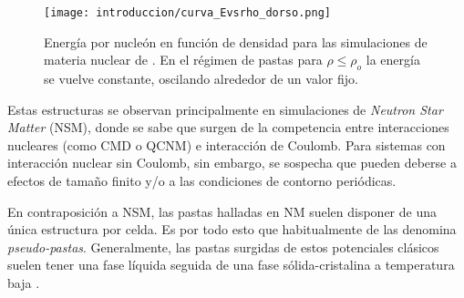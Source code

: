 \begin{figure}[H]
	\centering
	\texttt{[image: introduccion/curva\_Evsrho\_dorso.png]}
	\caption{Energía por nucleón en función de densidad para las simulaciones de materia nuclear de \cite{Dorso2018}.
	En el régimen de pastas para $\rho\leq\rho_o$ la energía se vuelve constante, oscilando alrededor de un valor fijo.}
	\label{fig:curva_Evsrho_dorso}
\end{figure}

Estas estructuras se observan principalmente en simulaciones de \textit{Neutron Star Matter} (NSM)\cite{Alcain}, donde se sabe que surgen de la competencia entre interacciones nucleares (como CMD o QCNM) e interacción de Coulomb. 
Para sistemas con interacción nuclear sin Coulomb, sin embargo, se sospecha que pueden deberse a efectos de tamaño finito y/o a las condiciones de contorno periódicas.

En contraposición a NSM, las pastas halladas en NM suelen disponer de una única estructura por celda.
Es por todo esto que habitualmente de las denomina \textit{pseudo-pastas}.
Generalmente, las pastas surgidas de estos potenciales clásicos suelen tener una fase líquida seguida de una fase sólida-cristalina a temperatura baja \cite{Dorso2018,Alcain,Dorso2019}.